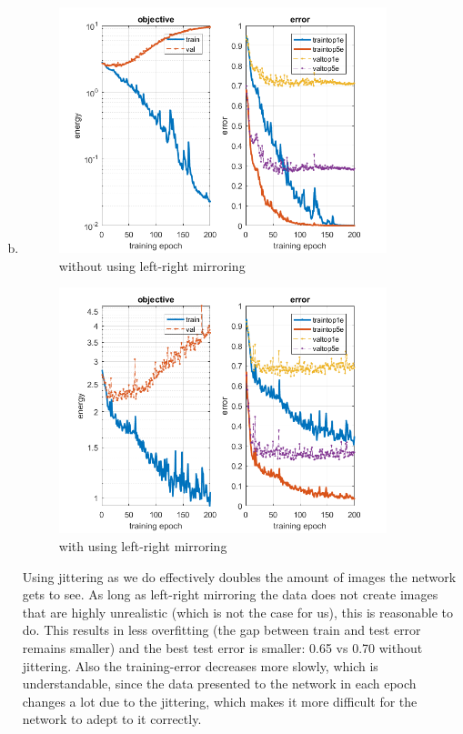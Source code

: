 \documentclass[12pt]{article}
\begin{document}
\begin{enumerate}[a)]
        \setcounter{enumi}{1}
    \item 
        \begin{figure}[H]
            \centering
                \includegraphics[width=0.9\textwidth]{Plots/init_plot_epo_200.png}
                \caption{without using left-right mirroring}
        \end{figure}
        \begin{figure}[H]
            \centering
                \includegraphics[width=0.9\textwidth]{Plots/q1_plot_epo_200.png}
                \caption{with using left-right mirroring}
        \end{figure}
        Using jittering as we do effectively doubles the amount of images the network gets to see. As long as left-right mirroring the data does not create images that are highly unrealistic (which is not the case for us), this is reasonable to do. This results in less overfitting (the gap between train and test error remains smaller) and the best test error is smaller: 0.65 vs 0.70 without jittering.
		Also the training-error decreases more slowly, which is understandable, since the data presented to the network in each epoch changes a lot due to the jittering, which makes it more difficult for the network to adept to it correctly.

\end{enumerate}
\end{document}
